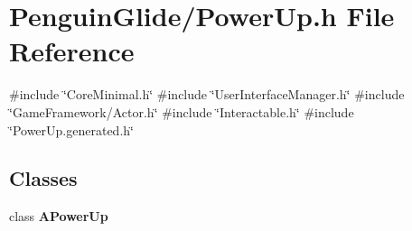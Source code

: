 \section{Penguin\+Glide/\+Power\+Up.h File Reference}
\label{_power_up_8h}
{\ttfamily \#include \char`\"{}Core\+Minimal.\+h\char`\"{}}\newline
{\ttfamily \#include \char`\"{}User\+Interface\+Manager.\+h\char`\"{}}\newline
{\ttfamily \#include \char`\"{}Game\+Framework/\+Actor.\+h\char`\"{}}\newline
{\ttfamily \#include \char`\"{}Interactable.\+h\char`\"{}}\newline
{\ttfamily \#include \char`\"{}Power\+Up.\+generated.\+h\char`\"{}}\newline
\subsection*{Classes}
\begin{DoxyCompactItemize}
\item 
class \textbf{ A\+Power\+Up}
\end{DoxyCompactItemize}
